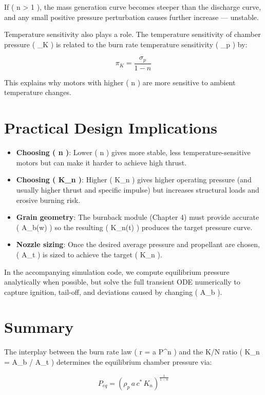 \documentclass[
  letterpaper,
  DIV=11,
  numbers=noendperiod]{scrreprt}
\providecommand{\tightlist}{%
  \setlength{\itemsep}{0pt}\setlength{\parskip}{0pt}}
\begin{document}
If ( n \textgreater{} 1 ), the mass generation curve becomes steeper
than the discharge curve, and any small positive pressure perturbation
causes further increase --- unstable.

Temperature sensitivity also plays a role. The temperature sensitivity
of chamber pressure ( \pi\_K ) is related to the burn rate temperature
sensitivity ( \sigma\_p ) by:

\[
\pi_K = \frac{\sigma_p}{1 - n}
\]

This explains why motors with higher ( n ) are more sensitive to ambient
temperature changes.

\section{Practical Design
Implications}\label{practical-design-implications}

\begin{itemize}
\tightlist
\item
  \textbf{Choosing ( n )}: Lower ( n ) gives more stable, less
  temperature-sensitive motors but can make it harder to achieve high
  thrust.
\item
  \textbf{Choosing ( K\_n )}: Higher ( K\_n ) gives higher operating
  pressure (and usually higher thrust and specific impulse) but
  increases structural loads and erosive burning risk.
\item
  \textbf{Grain geometry}: The burnback module (Chapter 4) must provide
  accurate ( A\_b(w) ) so the resulting ( K\_n(t) ) produces the target
  pressure curve.
\item
  \textbf{Nozzle sizing}: Once the desired average pressure and
  propellant are chosen, ( A\_t ) is sized to achieve the target ( K\_n
  ).
\end{itemize}

In the accompanying simulation code, we compute equilibrium pressure
analytically when possible, but solve the full transient ODE numerically
to capture ignition, tail-off, and deviations caused by changing ( A\_b
).

\section{Summary}\label{summary-1}

The interplay between the burn rate law ( r = a P\^{}n ) and the K/N
ratio ( K\_n = A\_b / A\_t ) determines the equilibrium chamber pressure
via:

\[
P_{eq} = \left( \rho_p \, a \, c^* \, K_n \right)^{\frac{1}{1-n}}
\]
\end{document}
